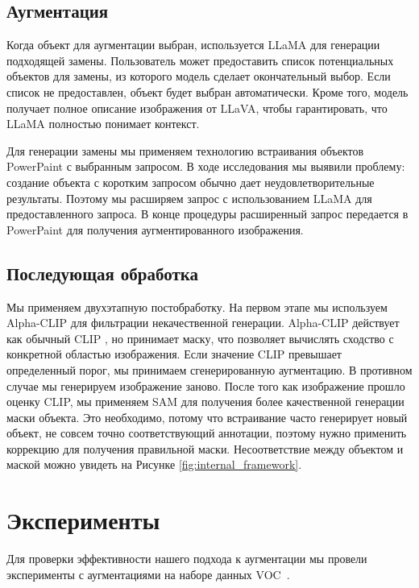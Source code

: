 \documentclass[11pt]{article}
\begin{document}
\subsection{Аугментация}

Когда объект для аугментации выбран, используется LLaMA \cite{dubey2024llama} для генерации подходящей замены. Пользователь может предоставить список потенциальных объектов для замены, из которого модель сделает окончательный выбор. Если список не предоставлен, объект будет выбран автоматически. Кроме того, модель получает полное описание изображения от LLaVA, чтобы гарантировать, что LLaMA полностью понимает контекст.

Для генерации замены мы применяем технологию встраивания объектов PowerPaint \cite{zhuang2023task} с выбранным запросом. В ходе исследования мы выявили проблему: создание объекта с коротким запросом обычно дает неудовлетворительные результаты. Поэтому мы расширяем запрос с использованием LLaMA для предоставленного запроса. В конце процедуры расширенный запрос передается в PowerPaint для получения аугментированного изображения.

\subsection{Последующая обработка}

Мы применяем двухэтапную постобработку. На первом этапе мы используем Alpha-CLIP \cite{sun2024alpha} для фильтрации некачественной генерации. Alpha-CLIP действует как обычный CLIP \cite{Radford2021}, но принимает маску, что позволяет вычислять сходство с конкретной областью изображения. Если значение CLIP превышает определенный порог, мы принимаем сгенерированную аугментацию. В противном случае мы генерируем изображение заново. После того как изображение прошло оценку CLIP, мы применяем SAM для получения более качественной генерации маски объекта. Это необходимо, потому что встраивание часто генерирует новый объект, не совсем точно соответствующий аннотации, поэтому нужно применить коррекцию для получения правильной маски. Несоответствие между объектом и маской можно увидеть на Рисунке \ref{fig:internal_framework}.

\section{Эксперименты}


Для проверки эффективности нашего подхода к аугментации мы провели эксперименты с аугментациями на наборе данных VOC~\cite{everingham2010pascal}.
\end{document}
